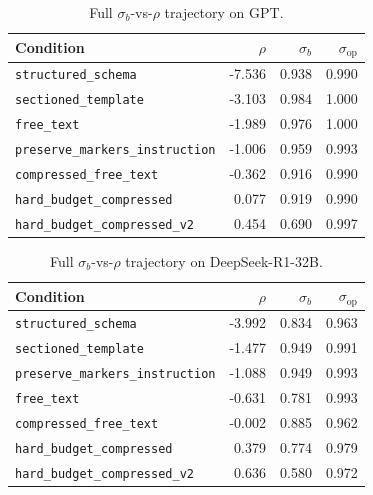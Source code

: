\begin{table}[!htbp]
\centering
\caption{Full $\sigma_b$-vs-$\rho$ trajectory on {GPT}.}
\label{tab:app_e2_rho_gpt}
\small
\begin{tabular}{@{}lrrr@{}}
\toprule
\textbf{Condition} & \boldmath$\rho$ & \boldmath$\sigma_b$ & \boldmath$\sigma_{\mathrm{op}}$ \\
\midrule
\texttt{structured\_schema}             & -7.536 & 0.938 & 0.990 \\
\texttt{sectioned\_template}            & -3.103 & 0.984 & 1.000 \\
\texttt{free\_text}                     & -1.989 & 0.976 & 1.000 \\
\texttt{preserve\_markers\_instruction} & -1.006 & 0.959 & 0.993 \\
\texttt{compressed\_free\_text}         & -0.362 & 0.916 & 0.990 \\
\texttt{hard\_budget\_compressed}       &  0.077 & 0.919 & 0.990 \\
\texttt{hard\_budget\_compressed\_v2}   &  0.454 & 0.690 & 0.997 \\
\bottomrule
\end{tabular}
\end{table}

\begin{table}[!htbp]
\centering
\caption{Full $\sigma_b$-vs-$\rho$ trajectory on     DeepSeek-R1-32B.}
\label{tab:app_e2_rho_ds}
\small
\begin{tabular}{@{}lrrr@{}}
\toprule
\textbf{Condition} & \boldmath$\rho$ & \boldmath$\sigma_b$ & \boldmath$\sigma_{\mathrm{op}}$ \\
\midrule
\texttt{structured\_schema}             & -3.992 & 0.834 & 0.963 \\
\texttt{sectioned\_template}            & -1.477 & 0.949 & 0.991 \\
\texttt{preserve\_markers\_instruction} & -1.088 & 0.949 & 0.993 \\
\texttt{free\_text}                     & -0.631 & 0.781 & 0.993 \\
\texttt{compressed\_free\_text}         & -0.002 & 0.885 & 0.962 \\
\texttt{hard\_budget\_compressed}       &  0.379 & 0.774 & 0.979 \\
\texttt{hard\_budget\_compressed\_v2}   &  0.636 & 0.580 & 0.972 \\
\bottomrule
\end{tabular}
\end{table}

